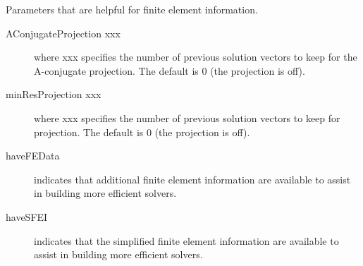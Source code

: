 \documentclass{article}
\begin{document}
\begin{cxxentry}
\begin{cxxentry}
\begin{cxxvariable}
\begin{cxxdoc}
Parameters that are helpful for finite element information.

\begin{description}
\item[AConjugateProjection xxx] where xxx specifies the number of previous
solution vectors to keep for the A-conjugate projection. 
The default is 0 (the projection is off).
\item[minResProjection xxx] where xxx specifies the number of previous
solution vectors to keep for projection. 
The default is 0 (the projection is off).
\item[haveFEData] indicates that additional finite element information are 
available to assist in building more efficient solvers. 
\item[haveSFEI] indicates that the simplified finite element information are 
available to assist in building more efficient solvers. 
\end{description}
\end{cxxdoc}
\end{cxxvariable}
\end{cxxentry}
\end{cxxentry}
\begin{cxxClassGraph}
\label{cxx.}
\end{cxxClassGraph}
\end{document}
